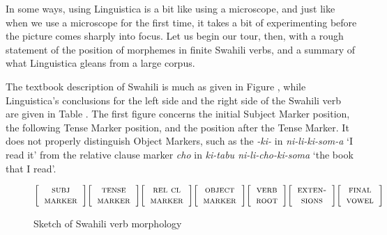 \documentclass[output=paper,colorlinks,citecolor=brown]{langscibook}
\begin{document}
In some ways, using Linguistica is a bit like using a microscope, and just like when we use a microscope for the first time, it takes a bit of experimenting before the picture comes sharply into focus. Let us begin our tour, then, with a rough statement of the position of morphemes in finite Swahili verbs, and a summary of what Linguistica gleans from a large corpus. 

The textbook description of Swahili is much as given in Figure , while Linguistica's conclusions for the left side and the right side of the Swahili verb are given in Table . The first figure concerns the initial Subject Marker position, the following Tense Marker position, and the position after the Tense Marker. It does not properly distinguish Object Markers, such as the \textit{-ki-} in \textit{ni-li-ki-som-a} `I read it'  from the relative clause marker  \textit{cho} in \textit{ki-tabu ni-li-cho-ki-soma} `the book that I read'.     

  
\begin{figure}
 
$\bigg[
\begin{tabular}{c} 
\textsc{subj}\\
\textsc{marker}\\
\end{tabular}
\bigg] 
\bigg[
\begin{tabular}{c} 
\textsc{tense}\\
\textsc{marker}\\
\end{tabular}
\bigg] 
\bigg[
\begin{tabular}{c} 
\textsc{rel cl}\\
\textsc{marker}\\
\end{tabular}
\bigg] 
\bigg[
\begin{tabular}{c} 
\textsc{object}\\
\textsc{marker}\\
\end{tabular}
\bigg] 
\bigg[
\begin{tabular}{c}
\textsc{verb}\\ 
\textsc{root}\\
\end{tabular}
\bigg] 
\bigg[
\begin{tabular}{c} 
\textsc{exten-}\\
\textsc{sions}
\end{tabular}
\bigg] 
\bigg[
\begin{tabular}{c} 
\textsc{final}\\
\textsc{vowel}
\end{tabular}
\bigg] 
$
\caption{Sketch of Swahili verb morphology}
\label{sketch}
\end{figure}
\end{document}
